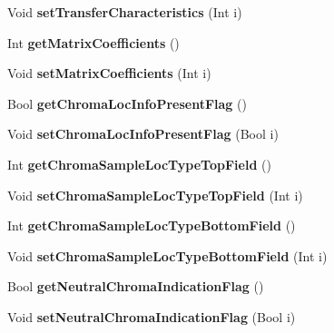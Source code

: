 \begin{DoxyCompactItemize}
\mbox{\label{class_t_enc_cfg_a971c99ac38e864526d17034f89fa799e}} 
Void {\bfseries set\+Transfer\+Characteristics} (Int i)
\item 
\mbox{\label{class_t_enc_cfg_a1e535e200f26c67d58b6a446c515215a}} 
Int {\bfseries get\+Matrix\+Coefficients} ()
\item 
\mbox{\label{class_t_enc_cfg_abe55622d42d549d1c2a46b0942d66034}} 
Void {\bfseries set\+Matrix\+Coefficients} (Int i)
\item 
\mbox{\label{class_t_enc_cfg_a3358495d67da5309bbe0af052dd93739}} 
Bool {\bfseries get\+Chroma\+Loc\+Info\+Present\+Flag} ()
\item 
\mbox{\label{class_t_enc_cfg_ad15f76196f244736d6ef47dff52b69e9}} 
Void {\bfseries set\+Chroma\+Loc\+Info\+Present\+Flag} (Bool i)
\item 
\mbox{\label{class_t_enc_cfg_a08390f3d07e8524516d197449cc37132}} 
Int {\bfseries get\+Chroma\+Sample\+Loc\+Type\+Top\+Field} ()
\item 
\mbox{\label{class_t_enc_cfg_a30697b873ca3892092bf7354a5dd6ff7}} 
Void {\bfseries set\+Chroma\+Sample\+Loc\+Type\+Top\+Field} (Int i)
\item 
\mbox{\label{class_t_enc_cfg_a5f8131b516c761ef9d634f9559f21116}} 
Int {\bfseries get\+Chroma\+Sample\+Loc\+Type\+Bottom\+Field} ()
\item 
\mbox{\label{class_t_enc_cfg_a565ca6c8d8c73803f72d274397fcbb06}} 
Void {\bfseries set\+Chroma\+Sample\+Loc\+Type\+Bottom\+Field} (Int i)
\item 
\mbox{\label{class_t_enc_cfg_a0e746e54f1ee6e0317050dcc2c24d4c5}} 
Bool {\bfseries get\+Neutral\+Chroma\+Indication\+Flag} ()
\item 
\mbox{\label{class_t_enc_cfg_adc146821e2c0ef8f1e347cf604cb4745}} 
Void {\bfseries set\+Neutral\+Chroma\+Indication\+Flag} (Bool i)
\item 

\end{DoxyCompactItemize}
